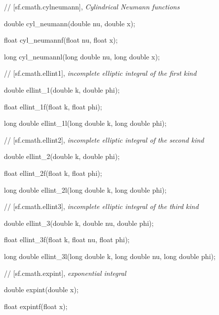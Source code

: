 \vspace{2ex}
// [sf.cmath.cyl{\bigund}neumann], {\it Cylindrical Neumann functions}
\vspace{2ex}

 double cyl\_neumann(double nu, double x);
	
 float cyl\_neumannf(float nu, float x);
	
 long cyl\_neumannl(long double nu, long double x);

\vspace{2ex}
// [sf.cmath.ellint{\bigund}1], {\it incomplete elliptic integral of the first kind}
\vspace{2ex}

 double ellint\_1(double k, double phi);
	
 float ellint\_1f(float k, float phi);
	
 long double ellint\_1l(long double k, long double phi);

\vspace{2ex}
// [sf.cmath.ellint{\bigund}2], {\it incomplete elliptic integral of the second kind}
\vspace{2ex}

 double ellint\_2(double k, double phi);
	
 float ellint\_2f(float k, float phi);
	
 long double ellint\_2l(long double k, long double phi);

\vspace{2ex}
// [sf.cmath.ellint{\bigund}3], {\it incomplete elliptic integral of the third kind}
\vspace{2ex}

 double ellint\_3(double k, double nu, double phi);
	
 float ellint\_3f(float k, float nu, float phi);
	
 long double ellint\_3l(long double k, long double nu, long double phi);

\vspace{2ex}
// [sf.cmath.expint], {\it exponential integral}
\vspace{2ex}

 double expint(double x);
	
 float expintf(float x);
	

